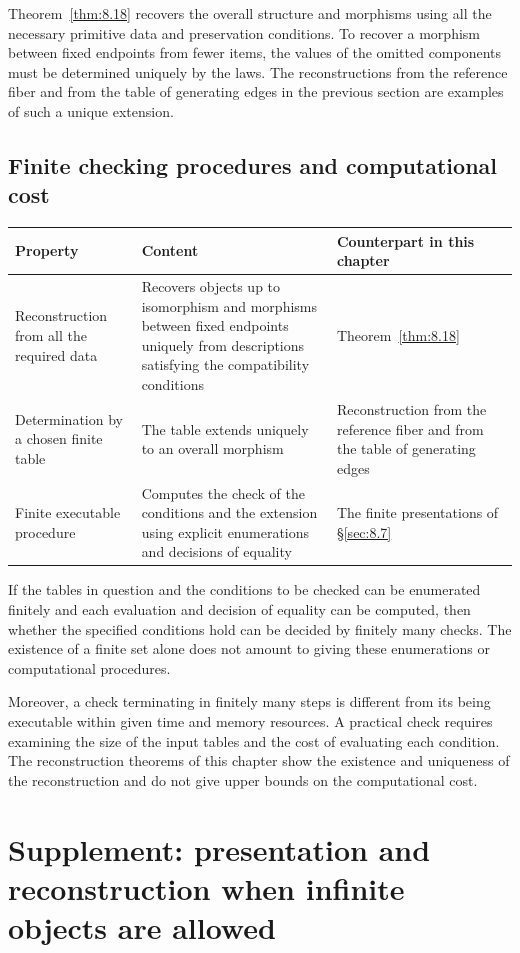 Theorem~\ref{thm:8.18} recovers the overall structure and morphisms using all the necessary
primitive data and preservation conditions.
To recover a morphism between fixed endpoints from fewer items, the values of the omitted
components must be determined uniquely by the laws.
The reconstructions from the reference fiber and from the table of generating edges in the
previous section are examples of such a unique extension.

\subsection*{Finite checking procedures and computational cost}

\begin{xltabular}{\linewidth}{@{}LLL@{}}
\toprule
Property & Content & Counterpart in this chapter \\
\midrule
\endhead
Reconstruction from all the required data & Recovers objects up to isomorphism and morphisms between fixed endpoints uniquely from descriptions satisfying the compatibility conditions & Theorem~\ref{thm:8.18} \\
\addlinespace[3pt]
Determination by a chosen finite table & The table extends uniquely to an overall morphism & Reconstruction from the reference fiber and from the table of generating edges \\
\addlinespace[3pt]
Finite executable procedure & Computes the check of the conditions and the extension using explicit enumerations and decisions of equality & The finite presentations of \S\ref{sec:8.7} \\
\bottomrule
\end{xltabular}

If the tables in question and the conditions to be checked can be enumerated finitely and each
evaluation and decision of equality can be computed, then whether the specified conditions hold
can be decided by finitely many checks.
The existence of a finite set alone does not amount to giving these enumerations or
computational procedures.

Moreover, a check terminating in finitely many steps is different from its being executable
within given time and memory resources.
A practical check requires examining the size of the input tables and the cost of evaluating
each condition.
The reconstruction theorems of this chapter show the existence and uniqueness of the
reconstruction and do not give upper bounds on the computational cost.

\section{Supplement: presentation and reconstruction when infinite objects are allowed}\label{sec:8.9}

